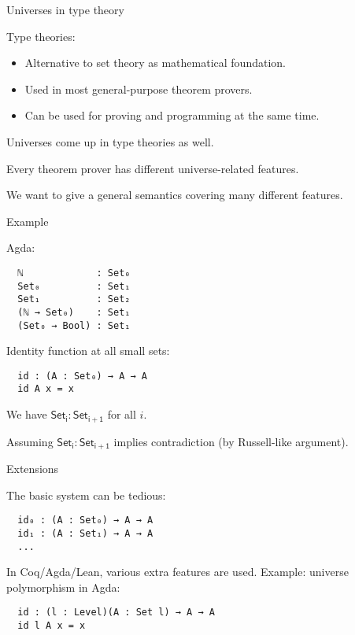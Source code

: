 \documentclass[dvipsnames,10pt,aspectratio=169]{beamer}
\begin{document}
\begin{frame}[fragile]{Universes in type theory}

Type theories:
\begin{itemize}
  \item Alternative to set theory as mathematical foundation.
  \item Used in most general-purpose theorem provers.
  \item Can be used for proving and programming at the same time.
\end{itemize}

Universes come up in type theories as well.
\vspace{1em}

Every theorem prover has different universe-related features.
\vspace{1em}

We want to give a general semantics covering many different features.

\end{frame}

\begin{frame}[fragile]{Example}

Agda:
\begin{verbatim}
  ℕ             : Set₀
  Set₀          : Set₁
  Set₁          : Set₂
  (ℕ → Set₀)    : Set₁
  (Set₀ → Bool) : Set₁
\end{verbatim}

Identity function at all small sets:
\begin{verbatim}
  id : (A : Set₀) → A → A
  id A x = x
\end{verbatim}

We have $\mathsf{Set_i} : \mathsf{Set_{i + 1}}$ for all $i$.
\vspace{1em}

Assuming $\mathsf{Set_i} : \mathsf{Set_{i + 1}}$ implies contradiction (by Russell-like argument).
\vspace{1em}

\end{frame}

\begin{frame}[fragile]{Extensions}

The basic system can be tedious:
\begin{verbatim}
  id₀ : (A : Set₀) → A → A
  id₁ : (A : Set₁) → A → A
  ...
\end{verbatim}

In Coq/Agda/Lean, various extra features are used.
Example: universe polymorphism in Agda:
\begin{verbatim}
  id : (l : Level)(A : Set l) → A → A
  id l A x = x
\end{verbatim}


\end{frame}
\end{document}
